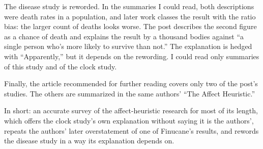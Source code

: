\begin{afterword}
The disease study is reworded. In the summaries I could read, both descriptions were death rates in a population, and later work classes the result with the ratio bias: the larger count of deaths looks worse. The post describes the second figure as a chance of death and explains the result by a thousand bodies against ``a single person who's more likely to survive than not.'' The explanation is hedged with ``Apparently,'' but it depends on the rewording. I could read only summaries of this study and of the clock study.

Finally, the article recommended for further reading covers only two of the post's studies. The others are summarized in the same authors' ``The Affect Heuristic.''

In short: an accurate survey of the affect-heuristic research for most of its length, which offers the clock study's own explanation without saying it is the authors', repeats the authors' later overstatement of one of Finucane's results, and rewords the disease study in a way its explanation depends on.
\end{afterword}
